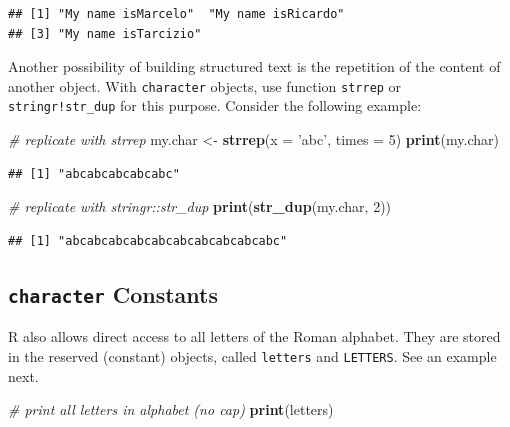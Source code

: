 \documentclass[11pt,]{book}
\newenvironment{Shaded}{\begin{snugshade}}{\end{snugshade}}
\newcommand{\KeywordTok}[1]{\textcolor[rgb]{0.27,0.27,0.27}{\textbf{#1}}}
\newcommand{\DataTypeTok}[1]{\textcolor[rgb]{0.27,0.27,0.27}{#1}}
\newcommand{\DecValTok}[1]{\textcolor[rgb]{0.06,0.06,0.06}{#1}}
\newcommand{\StringTok}[1]{\textcolor[rgb]{0.5,0.5,0.5}{#1}}
\newcommand{\CommentTok}[1]{\textcolor[rgb]{0.56,0.35,0.01}{\textit{#1}}}
\newcommand{\NormalTok}[1]{#1}
\begin{document}
\begin{verbatim}
## [1] "My name isMarcelo"  "My name isRicardo" 
## [3] "My name isTarcizio"
\end{verbatim}

Another possibility of building structured text is the repetition of the
content of another object. With \texttt{character} objects, use function
\texttt{strrep} or \texttt{stringr!str\_dup} for this purpose. Consider
the following example:  

\begin{Shaded}
\begin{Highlighting}[]
\CommentTok{# replicate with strrep}
\NormalTok{my.char <-}\StringTok{ }\KeywordTok{strrep}\NormalTok{(}\DataTypeTok{x =} \StringTok{'abc'}\NormalTok{, }\DataTypeTok{times =} \DecValTok{5}\NormalTok{)}
\KeywordTok{print}\NormalTok{(my.char)}
\end{Highlighting}
\end{Shaded}

\begin{verbatim}
## [1] "abcabcabcabcabc"
\end{verbatim}

\begin{Shaded}
\begin{Highlighting}[]
\CommentTok{# replicate with stringr::str_dup}
\KeywordTok{print}\NormalTok{(}\KeywordTok{str_dup}\NormalTok{(my.char, }\DecValTok{2}\NormalTok{))}
\end{Highlighting}
\end{Shaded}

\begin{verbatim}
## [1] "abcabcabcabcabcabcabcabcabcabc"
\end{verbatim}

\subsection{\texorpdfstring{\texttt{character}
Constants}{character Constants}}\label{character-constants}

R also allows direct access to all letters of the Roman alphabet. They
are stored in the reserved (constant) objects, called \texttt{letters}
and \texttt{LETTERS}. See an example next. 

\begin{Shaded}
\begin{Highlighting}[]
\CommentTok{# print all letters in alphabet (no cap)}
\KeywordTok{print}\NormalTok{(letters)}
\end{Highlighting}
\end{Shaded}
\end{document}

